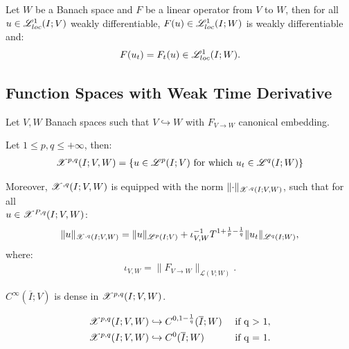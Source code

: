 \begin{lemma}
    Let $W$ be a Banach space and $F$ be a linear operator from $V$ to $W$, then for all $u \in \mathscr{L}^{1}_{loc}(I; V)$ weakly differentiable, $F(u) \in \mathscr{L}^{1}_{loc}(I; W)$ is weakly differentiable and:
    \begin{gather}
        F(u_t) = F_t(u) \in \mathscr{L}^{1}_{loc}(I; W).
    \end{gather}
\end{lemma}

\newpage
\subsection{Function Spaces with Weak Time Derivative}

Let $V, W$ Banach spaces such that $V \hookrightarrow W$ with $F_{V \rightarrow W}$ canonical embedding.

\begin{definition}[$\SpaceXpq{p}{q}(I; V, W)$]
    Let $1 \leq p, q \leq +\infty$, then:
    \begin{gather}
        \mathscr{X}^{p, q}(I; V, W) = \left\{ u \in \mathscr{L}^{p}(I; V) \text{ for which } u_t \in \mathscr{L}^{q}(I; W) \right\}
    \end{gather}

    Moreover, $\mathscr{X}^{, q}(I; V, W)$ is equipped with the norm $\lVert \cdot \rVert_{\mathscr{X}^{, q}(I; V, W)}$, such that for all \\ $u \in \mathscr{X}^{P, q}(I; V, W)$:
    \begin{gather}
        \lVert u \rVert_{\mathscr{X}^{, q}(I; V, W)} = \lVert u \rVert_{\mathscr{L}^{p}(I; V)} + \iota_{V, W}^{-1}T^{1 + \frac{1}{p} - \frac{1}{q}} \lVert u_t \rVert_{\mathscr{L}^{q}(I; W)},
    \end{gather}
    where:
    \begin{gather}
        \iota_{V, W} = \lVert F_{V \rightarrow W} \rVert_{\mathcal{L}(V;W)}.
    \end{gather}
\end{definition}

\begin{theorem}
    $C^{\infty}(\overline{I}; V)$ is dense in $\SpaceXpq{p}{q}(I; V, W)$.
\end{theorem}

\begin{lemma}
    \begin{align}
        & \mathscr{X}^{p, q}(I; V, W) \hookrightarrow C^{0, 1 - \frac{1}{q}}(\overline{I}; W) & \text{ if q > 1}, \\
        & \mathscr{X}^{p, q}(I; V, W) \hookrightarrow C^{0}(\overline{I}; W) & \text{ if q = 1}.
    \end{align}
\end{lemma}

